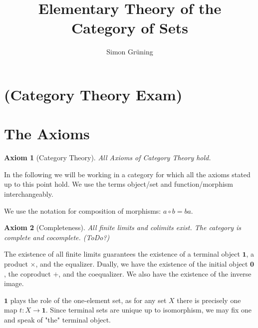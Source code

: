 


\title{Elementary Theory of the Category of Sets}
\author{Simon Gr\"uning}
\address[Simon Gr\"uning]{University of Zurich, R\"{a}mistrasse 71, 8006 Zurich}

\newtheorem{axiom}{Axiom}
\setcounter{axiom}{-1}

\maketitle

\section*{(Category Theory Exam)}


\clearpage




\section{The Axioms}

\begin{axiom}[Category Theory]
All Axioms of Category Theory hold.
\end{axiom}

\begin{remark}
In the following we will be working in a category for which all the axioms stated up to this point hold. We use the terms object/set and function/morphism interchangeably.

We use the notation for composition of morphisms: $a \circ b = ba$.
\end{remark}

\begin{axiom}[Completeness]
All finite limits and colimits exist. The category is complete and cocomplete. (ToDo?)
\end{axiom}

\begin{remark}
The existence of all finite limits guarantees the existence of a terminal object $\mathbf{1}$, a product $\times$, and the equalizer. Dually, we have the existence of the initial object $\mathbf{0}$, the coproduct $+$, and the coequalizer. We also have the existence of the inverse image.
\end{remark}

\begin{remark}
$\mathbf{1}$ plays the role of the one-element set, as for any set $X$ there is precisely one map $t: X \longrightarrow \mathbf{1}$. Since terminal sets are unique up to isomorphism, we may fix one and speak of "the" terminal object.
\end{remark}

